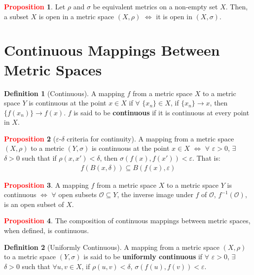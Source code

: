 \documentclass[11pt]{article}
\newcommand{\open}[0]{\mathcal{O}}
\theoremstyle{definition}
\theoremstyle{definition}
\theoremstyle{definition}
\newtheorem{definition}{\textcolor{OliveGreen}{Definition}}
\newtheorem{prop}{\textcolor{red}{Proposition}}
\theoremstyle{remark}
\begin{document}
\begin{prop}
	Let $\rho$ and $\sigma$ be equivalent metrics on a non-empty set $X$. Then, a subset $X$ is open in a metric space $(X, \rho)$ $\iff$ it is open in $(X, \sigma)$. 
\end{prop}
	
\section{Continuous Mappings Between Metric Spaces}

\begin{definition}[Continuous]
	A mapping $f$ from a metric space $X$ to a metric space $Y$ is continuous at the point $x \in X$ if $\forall$ $\{ x_n \} \in X$, if $\{ x_n \} \rightarrow x$, then $\{ f(x_n) \} \rightarrow f(x)$. $f$ is said to be \textbf{continuous} if it is continuous at every point in $X$. 
\end{definition}

\begin{prop}[$\varepsilon$-$\delta$ criteria for continuity] 
	A mapping from a metric space $(X, \rho)$ to a metric $(Y, \sigma)$ is continuous at the point $x \in X$ $\iff$ $\forall$ $\varepsilon > 0$, $\exists$ $\delta > 0$ such that if $\rho(x, x') < \delta$, then $\sigma(f(x), f(x')) < \varepsilon$. That is: 
	\begin{align}
		f(B(x, \delta)) \subseteq B(f(x), \varepsilon) 
	\end{align}
\end{prop}

\begin{prop}
	A mapping $f$ from a metric space $X$ to a metric space $Y$ is continuous $\iff$ $\forall$ open subsets $\open \subseteq Y$, the inverse image under $f$ of $\open$, $f^{-1}(\open)$, is an open subset of $X$. 
\end{prop}

\begin{prop}
	The composition of continuous mappings between metric spaces, when defined, is continuous. 
\end{prop}

\begin{definition}[Uniformly Continuous] 
	A mapping from a metric space $(X, \rho)$ to a metric space $(Y, \sigma)$ is said to be \textbf{uniformly continuous} if $\forall$ $\varepsilon > 0$, $\exists$ $\delta > 0$ such that $\forall u, v \in X$, if $\rho(u, v) < \delta$, $\sigma(f(u), f(v)) < \varepsilon$. 
\end{definition}
\end{document}
